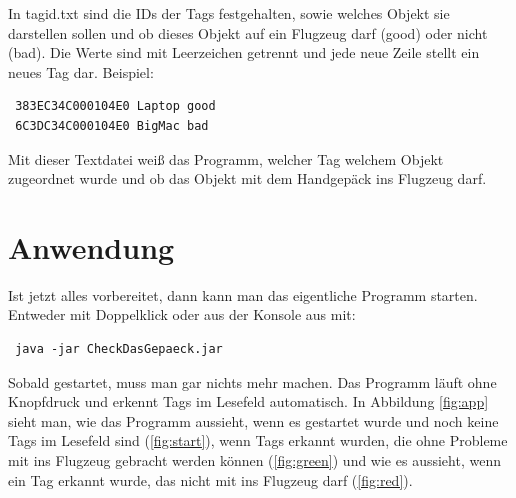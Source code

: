 \documentclass[paper=a4,fontsize=11pt,headsepline,footsepline,parskip=half]{scrartcl}
\begin{document}
In tagid.txt sind die IDs der Tags festgehalten, sowie welches Objekt sie darstellen sollen und ob dieses Objekt auf ein Flugzeug darf (good)
oder nicht (bad). Die Werte sind mit Leerzeichen getrennt und jede neue Zeile stellt ein neues Tag dar. Beispiel:

\begin{lstlisting}
 383EC34C000104E0 Laptop good
 6C3DC34C000104E0 BigMac bad
\end{lstlisting}

Mit dieser Textdatei weiß das Programm, welcher Tag welchem Objekt zugeordnet wurde und ob das Objekt mit dem
Handgepäck ins Flugzeug darf.

\section{Anwendung}

Ist jetzt alles vorbereitet, dann kann man das eigentliche Programm starten. Entweder mit Doppelklick oder aus der Konsole aus mit:

\begin{lstlisting}
 java -jar CheckDasGepaeck.jar
\end{lstlisting}

Sobald gestartet, muss man gar nichts mehr machen. Das Programm läuft ohne Knopfdruck und erkennt Tags im
Lesefeld automatisch. In Abbildung \ref{fig:app} sieht man, wie das Programm aussieht, wenn es gestartet
wurde und noch keine Tags im Lesefeld sind (\ref{fig:start}), wenn Tags erkannt wurden, die ohne Probleme
mit ins Flugzeug gebracht werden können (\ref{fig:green}) und wie es aussieht, wenn ein Tag erkannt wurde,
das nicht mit ins Flugzeug darf (\ref{fig:red}).
\end{document}
